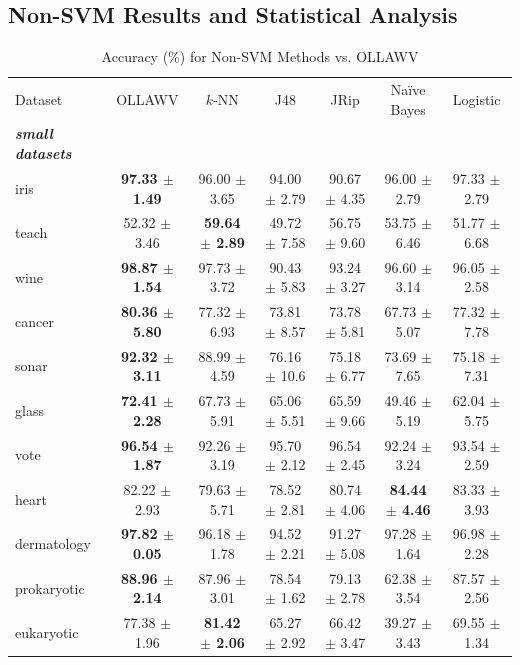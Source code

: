 \documentclass[reqno]{vcuthesis}
\numberwithin{equation}{chapter}
\begin{document}
\subsection{Non-SVM Results and Statistical Analysis}
\begin{table}[t!]
\caption{Accuracy (\%) for Non-SVM Methods vs. OLLAWV}
\scriptsize
\centering
\label{tab:OtherResultsacc}
\begin{tabularx}{\textwidth}{l@{\extracolsep{\fill}}cccccc}
\noalign{\smallskip}\hline\noalign{\smallskip}
Dataset & OLLAWV & $k$-NN & J48 & JRip & Na\"ive Bayes & Logistic \\
\noalign{\smallskip}\hline\noalign{\smallskip}
\textbf{\textit{small datasets}} & & & & & & \\
iris & \textbf{97.33 $\pm$ 1.49} & 96.00 $\pm$ 3.65 & 94.00 $\pm$ 2.79 & 90.67 $\pm$ 4.35 & 96.00 $\pm$ 2.79 & 97.33 $\pm$ 2.79  \\
teach & 52.32 $\pm$ 3.46 & \textbf{59.64 $\pm$ 2.89} & 49.72 $\pm$ 7.58 & 56.75 $\pm$ 9.60 & 53.75 $\pm$ 6.46 & 51.77 $\pm$ 6.68 \\
wine & \textbf{98.87 $\pm$ 1.54} & 97.73 $\pm$ 3.72 & 90.43 $\pm$ 5.83 & 93.24 $\pm$ 3.27 & 96.60 $\pm$ 3.14 & 96.05 $\pm$ 2.58 \\
cancer & \textbf{80.36 $\pm$ 5.80} & 77.32 $\pm$ 6.93 & 73.81 $\pm$ 8.57 & 73.78 $\pm$ 5.81 & 67.73 $\pm$ 5.07 & 77.32 $\pm$ 7.78 \\
sonar & \textbf{92.32 $\pm$ 3.11} & 88.99 $\pm$ 4.59 & 76.16 $\pm$ 10.6 & 75.18 $\pm$ 6.77 & 73.69 $\pm$ 7.65 & 75.18 $\pm$ 7.31 \\
glass & \textbf{72.41 $\pm$ 2.28} & 67.73 $\pm$ 5.91 & 65.06 $\pm$ 5.51 & 65.59 $\pm$ 9.66 & 49.46 $\pm$ 5.19 & 62.04 $\pm$ 5.75 \\
vote & \textbf{96.54 $\pm$ 1.87} & 92.26 $\pm$ 3.19 & 95.70 $\pm$ 2.12 & 96.54 $\pm$ 2.45 & 92.24 $\pm$ 3.24 & 93.54 $\pm$ 2.59 \\
heart & 82.22 $\pm$ 2.93 & 79.63 $\pm$ 5.71 & 78.52 $\pm$ 2.81 & 80.74 $\pm$ 4.06 & \textbf{84.44 $\pm$ 4.46} & 83.33 $\pm$ 3.93 \\
dermatology & \textbf{97.82 $\pm$ 0.05} & 96.18 $\pm$ 1.78 & 94.52 $\pm$ 2.21 & 91.27 $\pm$ 5.08 & 97.28 $\pm$ 1.64 & 96.98 $\pm$ 2.28 \\
prokaryotic & \textbf{88.96 $\pm$ 2.14} & 87.96 $\pm$ 3.01 & 78.54 $\pm$ 1.62 & 79.13 $\pm$ 2.78 & 62.38 $\pm$ 3.54 & 87.57 $\pm$ 2.56 \\
eukaryotic & 77.38 $\pm$ 1.96 & \textbf{81.42 $\pm$ 2.06} & 65.27 $\pm$ 2.92 & 66.42 $\pm$ 3.47 & 39.27 $\pm$ 3.43 & 69.55 $\pm$ 1.34 \\

\end{tabularx}
\end{table}
\end{document}
